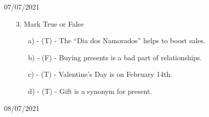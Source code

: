 \documentclass{SchoolBook}
\begin{document}
\begin{day}{07/07/2021}
\begin{enumerate}
            \item[3.] Mark True or False
            \begin{enumerate}
                \item[a)] - (T) - The ``Dia dos Namorados'' helps to boost sales.
                \item[b)] - (F) - Buying presents is a bad part of relationships.
                \item[c)] - (T) - Valentine's Day is on February 14th.
                \item[d)] - (T) - Gift is a synonym for present.
            \end{enumerate}
        \end{enumerate}
    \end{day}
    
    \begin{day}{08/07/2021}
        
    \end{day}
\end{document}
